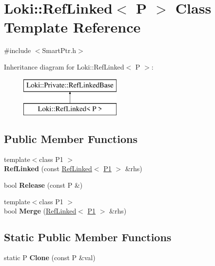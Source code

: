 \hypertarget{classLoki_1_1RefLinked}{}\section{Loki\+:\+:Ref\+Linked$<$ P $>$ Class Template Reference}
\label{classLoki_1_1RefLinked}


{\ttfamily \#include $<$Smart\+Ptr.\+h$>$}

Inheritance diagram for Loki\+:\+:Ref\+Linked$<$ P $>$\+:\begin{figure}[H]
\begin{center}
\leavevmode
\includegraphics[height=2.000000cm]{classLoki_1_1RefLinked}
\end{center}
\end{figure}
\subsection*{Public Member Functions}
\begin{DoxyCompactItemize}
\item 
\hypertarget{classLoki_1_1RefLinked_aabb2e6b020e2e1a03cd1d1a782119f10}{}{\footnotesize template$<$class P1 $>$ }\\{\bfseries Ref\+Linked} (const \hyperlink{classLoki_1_1RefLinked}{Ref\+Linked}$<$ \hyperlink{structP1}{P1} $>$ \&rhs)\label{classLoki_1_1RefLinked_aabb2e6b020e2e1a03cd1d1a782119f10}

\item 
\hypertarget{classLoki_1_1RefLinked_a6978eb9ea49946a6934cad4e7114b172}{}bool {\bfseries Release} (const P \&)\label{classLoki_1_1RefLinked_a6978eb9ea49946a6934cad4e7114b172}

\item 
\hypertarget{classLoki_1_1RefLinked_a020aef9fb2d18afc27cc53432da28a13}{}{\footnotesize template$<$class P1 $>$ }\\bool {\bfseries Merge} (\hyperlink{classLoki_1_1RefLinked}{Ref\+Linked}$<$ \hyperlink{structP1}{P1} $>$ \&rhs)\label{classLoki_1_1RefLinked_a020aef9fb2d18afc27cc53432da28a13}

\end{DoxyCompactItemize}
\subsection*{Static Public Member Functions}
\begin{DoxyCompactItemize}
\item 
\hypertarget{classLoki_1_1RefLinked_a74353cd3305ac99d159633cccd4ad7a5}{}static P {\bfseries Clone} (const P \&val)\label{classLoki_1_1RefLinked_a74353cd3305ac99d159633cccd4ad7a5}

\end{DoxyCompactItemize}
